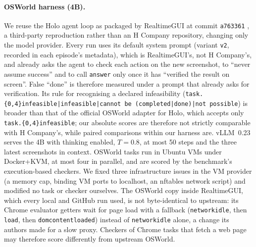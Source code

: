 \paragraph{OSWorld harness (4B).} We reuse the Holo agent loop as packaged by RealtimeGUI at commit \texttt{a763361} \citep{realtimegui}, a third-party reproduction rather than an H Company repository, changing only the model provider. Every run uses its default system prompt (variant \texttt{v2}, recorded in each episode's metadata), which is RealtimeGUI's, not H Company's, and already asks the agent to check each action on the new screenshot, to ``never assume success'' and to call \texttt{answer} only once it has ``verified the result on screen''. False ``done'' is therefore measured under a prompt that already asks for verification. %
Its rule for recognising a declared infeasibility (\texttt{task.\{0,4\}infeasible|infeasible|cannot be (completed|done)|not possible}) is broader than that of the official OSWorld adapter for Holo, which accepts only \texttt{task.\{0,4\}infeasible}; our absolute scores are therefore not strictly comparable with H Company's, while paired comparisons within our harness are. %
vLLM~0.23 serves the 4B with thinking enabled, $T=0.8$, at most 50 steps and the three latest screenshots in context. %
OSWorld \citep{xie2024osworld} tasks run in Ubuntu VMs under Docker+KVM, at most four in parallel, and are scored by the benchmark's execution-based checkers. We fixed three infrastructure issues in the VM provider (a memory cap, binding VM ports to localhost, an nftables network script) and modified no task or checker ourselves. The OSWorld copy inside RealtimeGUI, which every local and GitHub run used, is not byte-identical to upstream: its Chrome evaluator getters wait for page load with a fallback (\texttt{networkidle}, then \texttt{load}, then \texttt{domcontentloaded}) instead of \texttt{networkidle} alone, a change its authors made for a slow proxy. Checkers of Chrome tasks that fetch a web page may therefore score differently from upstream OSWorld. %


